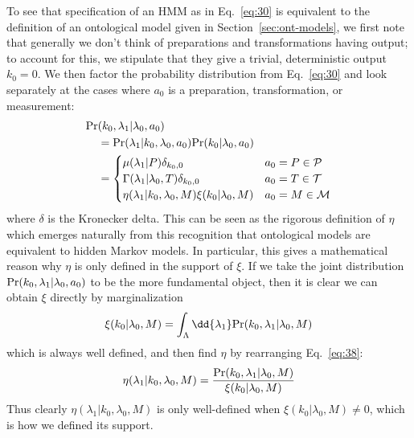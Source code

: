 \documentclass[%
 reprint,
superscriptaddress,
nofootinbib,
 amsmath,amssymb,
 prx, 
 accepted=2019-09-27,
]{quantumarticle}
\renewcommand{\Pr}{\textup{Pr}}
\begin{document}
To see that specification of an HMM as in Eq.~\ref{eq:30} is
equivalent to the definition of an ontological model given in
Section~\ref{sec:ont-models}, we first note that generally we don't
think of preparations and transformations having output; to account
for this, we stipulate that they give a trivial, deterministic output
$k_0=0$. We then factor the probability distribution from
Eq.~\ref{eq:30} and look separately at the cases where $a_0$ is a
preparation, transformation, or measurement:
\begin{align} 
  \Pr&(k_0,\lambda_1|\lambda_0,a_0)\nonumber\\
  &= \Pr(\lambda_1|k_0,\lambda_0,a_0)\Pr(k_0|\lambda_0,a_0)\nonumber\\
  &=
    \begin{cases}
      \mu(\lambda_1|P) \delta_{k_0,0} & a_0 =P\in \mathcal P\\
      \Gamma(\lambda_1|\lambda_0,T) \delta_{k_0,0} & a_0 =T\in \mathcal T\\
      \eta(\lambda_1|k_0,\lambda_0,M)\xi(k_0|\lambda_0,M) & a_0 =M\in \mathcal M
    \end{cases}
                                                            \label{eq:38}
\end{align}
where $\delta$ is the Kronecker delta. This can be seen as the
rigorous definition of $\eta$ which emerges naturally from this
recognition that ontological models are equivalent to hidden Markov
models. In particular, this gives a mathematical reason why $\eta$ is
only defined in the support of $\xi$. If we take the joint
distribution $\Pr(k_0,\lambda_1|\lambda_0,a_0)$ to be the more
fundamental object, then it is clear we can obtain $\xi$ directly by
marginalization
\begin{equation}
  \label{eq:37}
  \xi(k_0|\lambda_0,M)=\int_\Lambda \dd{\lambda_1} \Pr(k_0,\lambda_1|\lambda_0,M)
\end{equation}
which is always well defined, and then find $\eta$ by rearranging
Eq.~\ref{eq:38}:
\begin{equation}
  \label{eq:39}
  \eta(\lambda_1|k_0,\lambda_0,M) = \frac{\Pr(k_0,\lambda_1|\lambda_0,M)}{\xi(k_0|\lambda_0,M)}
\end{equation}
Thus clearly $\eta(\lambda_1|k_0,\lambda_0,M)$ is only well-defined
when $\xi(k_0|\lambda_0,M)\neq0$, which is how we defined its support.
\end{document}
